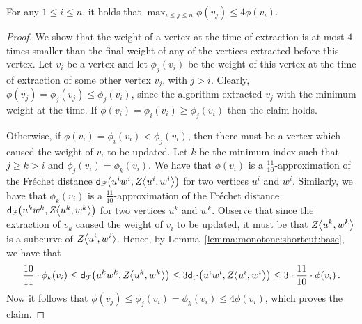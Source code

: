 \documentclass[12pt]{article}
\newcommand{\lemlab}[1]{\label{lemma:#1}}
\newcommand{\lemref}[1]{Lemma~\ref{lemma:#1}}
\newcommand{\ts}{\hspace{0.6pt}}
\newcommand{\Frechet}{Fr\'{e}c{h}e{}t\xspace}\providecommand{\Arr}{\mathop{\mathrm{\EuScript{A}}}}
\newcommand{\distFr}[2]{\mathsf{d}_{\EuScript{F}}\pth{#1, #2}}
\newcommand{\cZ}{{Z}}
\providecommand{\pth}[2][\!]{#1\left({#2}\right)}
\newcommand{\SC}[3]{{#1}\!\!\ts\ts \left\langle  #2, #3 \right\rangle}
\newcommand{\vtxA}{u}
\newcommand{\vtxB}{v}
\newcommand{\vtxC}{w}
\newcommand{\const}{\ensuremath{\frac{11}{10}}}
\newcommand{\constR}{\ensuremath{\frac{10}{11}}}
\newcommand{\weightIdx}[2]{\ensuremath{\phi_{#1}\pth{#2}}}
\newcommand{\weight}[1]{\ensuremath{\phi\pth{\vtx_{#1}}}}
\newcommand{\vtx}{\vtxB}
\newcommand{\segX}[2]{{#1}{#2}}
\numberwithin{figure}{section}
\numberwithin{equation}{section}
\begin{document}
\begin{lemma}\lemlab{universal:0}For any $1 \leq i \leq n$, it holds that $\max_{i \leq j \leq n}
    \weight{j} \leq 4 \weight{i}$.
\end{lemma}
\begin{proof}
    We show that the weight of a vertex at the time of extraction is
    at most $4$ times smaller than the final weight of any of the
    vertices extracted before this vertex.  Let $\vtx_i$ be a vertex
    and let $\weightIdx{j}{\vtx_i}$ be the weight of this vertex at
    the time of extraction of some other vertex $\vtx_j$, with $j >
    i$. Clearly, $\weight{j} = \weightIdx{j}{\vtx_j} \leq
    \weightIdx{j}{\vtx_i}$, since the algorithm extracted $\vtx_j$
    with the minimum weight at the time.  If $\weight{i} =
    \weightIdx{i}{\vtx_i} \geq \weightIdx{j}{\vtx_i}$ then the claim
    holds.
    
    Otherwise, if $\weight{i} = \weightIdx{i}{\vtx_i} <
    \weightIdx{j}{\vtx_i}$, then there must be a vertex which caused
    the weight of $\vtx_i$ to be updated. Let $k$ be the minimum index
    such that $j \geq k > i$ and
    $\weightIdx{j}{\vtx_i}=\weightIdx{k}{\vtx_i}$.  We have that
    $\weight{i}$ is a $\const$-approximation of the \Frechet distance
    $\distFr{\segX{\vtxA^i}{\vtxC^i}}{\SC{\cZ}{\vtxA^i}{\vtxC^i}}$ for
    two vertices $\vtxA^i$ and $\vtxC^i$.  Similarly, we have that
    $\weightIdx{k}{\vtx_i}$ is a $\const$-approximation of the
    \Frechet distance
    $\distFr{\segX{\vtxA^k}{\vtxC^k}}{\SC{\cZ}{\vtxA^k}{\vtxC^k}}$ for
    two vertices $\vtxA^k$ and $\vtxC^k$.  Observe that since the
    extraction of $\vtx_k$ caused the weight of $\vtx_i$ to be
    updated, it must be that $\SC{\cZ}{\vtxA^k}{\vtxC^k}$ is a
    subcurve of $\SC{\cZ}{\vtxA^i}{\vtxC^i}$.  Hence, by
    \lemref{monotone:shortcut:base}, we have that
    \begin{align*}
        \constR \cdot \weightIdx{k}{\vtx_i}\leq \distFr{\segX{\vtxA^k}{\vtxC^k}}{\SC{\cZ}{\vtxA^k}{\vtxC^k}}
        \leq 3 \distFr{\segX{\vtxA^i}{\vtxC^i}}{\SC{\cZ}{\vtxA^i}{\vtxC^i}}
        \leq 3 \cdot \const \cdot \weight{i}.
    \end{align*}
    Now it follows that $\weight{j} \leq \weightIdx{j}{\vtx_i} =
    \weightIdx{k}{\vtx_i} \leq 4 \weight{i}$, which proves the claim.
\end{proof}
\end{document}
